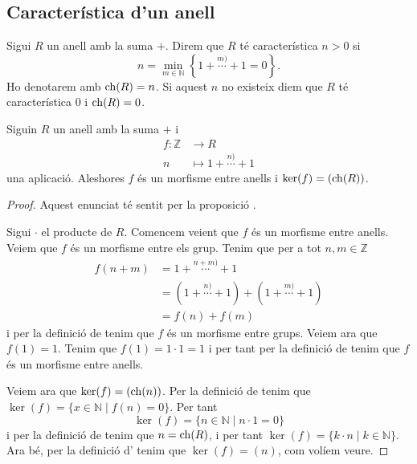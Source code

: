 \documentclass[../Apunts.tex]{subfiles}
\begin{document}
	\subsection{Característica d'un anell}
	\begin{definition}[Característica]
		\label{def:característica d'un anell}
		Sigui \(R\) un anell amb la suma \(+\). Direm que \(R\) té característica \(n>0\) si \[n=\min_{m\in\mathbb{N}}\left\{1+\overset{m)}{\cdots}+1=0\right\}.\]
		Ho denotarem amb \(\operatorname{ch}(R)=n\). Si aquest \(n\) no existeix diem que \(R\) té característica \(0\) i \(\operatorname{ch}(R)=0\).
	\end{definition}
	\begin{proposition}
		\label{prop:morfisme entre anells per trobar característica}
		Siguin \(R\) un anell amb la suma \(+\) i
		\begin{align*}
		f\colon\mathbb{Z}&\longrightarrow R\\
		n&\longmapsto 1+\overset{n)}{\cdots}+1
		\end{align*}
		una aplicació. Aleshores \(f\) és un morfisme entre anells i \(\operatorname{ker}(f)=(\operatorname{ch}(R))\).
		\begin{proof}
			Aquest enunciat té sentit per la proposició . %
			
			Sigui \(\cdot\) el producte de \(R\). Comencem veient que \(f\) és un morfisme entre anells. Veiem que \(f\) és un morfisme entre els grup. Tenim que per a tot \(n,m\in\mathbb{Z}\)
			\begin{align*}
				f(n+m)&=1+\overset{n+m)}{\cdots}+1\\
				&=(1+\overset{n)}{\cdots}+1)+(1+\overset{m)}{\cdots}+1)\\
				&=f(n)+f(m)
			\end{align*}
			i per la definició de  tenim que \(f\) és un morfisme entre grups. Veiem ara que \(f(1)=1\). Tenim que \(f(1)=1\cdot1=1\) i per tant per la definició de  tenim que \(f\) és un morfisme entre anells.
			
			Veiem ara que \(\operatorname{ker}(f)=(\operatorname{ch}(n))\). Per la definició de  tenim que \(\ker(f)=\{x\in\mathbb{N}\mid f(n)=0\}\).	Per tant
			\[\ker(f)=\{n\in\mathbb{N}\mid n\cdot1=0\}\]
			i per la definició de  tenim que \(n=\operatorname{ch}(R)\), i per tant \(\ker(f)=\{k\cdot n\mid k\in\mathbb{N}\}\). Ara bé, per la definició d' tenim que \(\ker(f)=(n)\), com volíem veure.
		\end{proof}
	\end{proposition}
\end{document}
